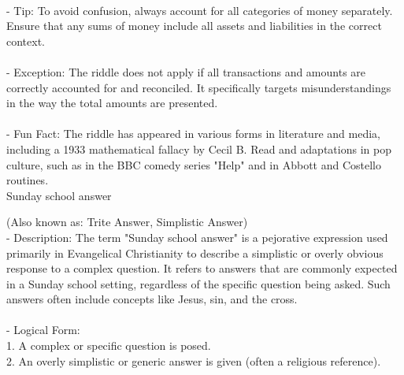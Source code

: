 \documentclass[a4paper,12pt,single,pdftex]{scrbook}
\begin{document}
    
      
    \\

    
      - Tip: To avoid confusion, always account for all categories of money separately. Ensure that any sums of money include all assets and liabilities in the correct context.
    \\

    
      
    \\

    
      - Exception: The riddle does not apply if all transactions and amounts are correctly accounted for and reconciled. It specifically targets misunderstandings in the way the total amounts are presented.
    \\

    
      
    \\

    
      - Fun Fact: The riddle has appeared in various forms in literature and media, including a 1933 mathematical fallacy by Cecil B. Read and adaptations in pop culture, such as in the BBC comedy series "Help" and in Abbott and Costello routines.
    \\

  

Sunday school answer
    
      (Also known as: Trite Answer, Simplistic Answer)
    \\

  
    
      - Description: The term "Sunday school answer" is a pejorative expression used primarily in Evangelical Christianity to describe a simplistic or overly obvious response to a complex question. It refers to answers that are commonly expected in a Sunday school setting, regardless of the specific question being asked. Such answers often include concepts like Jesus, sin, and the cross.
    \\

    
      
    \\

    
      - Logical Form:
    \\

    
        1. A complex or specific question is posed.
    \\

    
        2. An overly simplistic or generic answer is given (often a religious reference).
    \\
\end{document}
